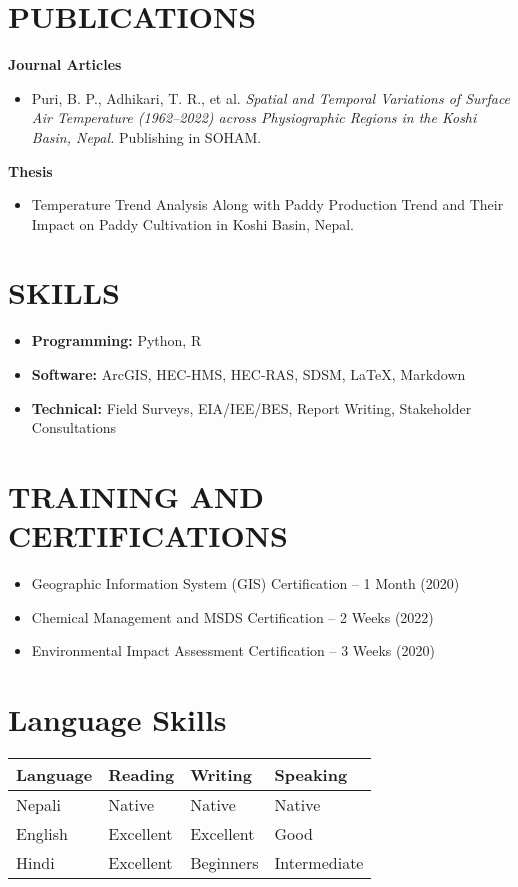 \documentclass[a4paper,9pt]{extarticle}
\begin{document}
\section*{PUBLICATIONS}
\noindent
\textbf{Journal Articles}
\begin{itemize}
    \item Puri, B. P., Adhikari, T. R., et al. \textit{Spatial and Temporal Variations of Surface Air Temperature (1962–2022) across Physiographic Regions in the Koshi Basin, Nepal.} Publishing in SOHAM.
\end{itemize}

\noindent
\textbf{Thesis}
\begin{itemize}
    \item Temperature Trend Analysis Along with Paddy Production Trend and Their Impact on Paddy Cultivation in Koshi Basin, Nepal.

\end{itemize}

\section*{SKILLS}
\begin{itemize}
    \item \textbf{Programming:} Python, R
    \item \textbf{Software:} ArcGIS, HEC-HMS, HEC-RAS, SDSM, LaTeX, Markdown
    \item \textbf{Technical:} Field Surveys, EIA/IEE/BES, Report Writing, Stakeholder Consultations
\end{itemize}

\section*{TRAINING AND CERTIFICATIONS}
\begin{itemize}
    \item Geographic Information System (GIS) Certification – 1 Month (2020)
    \item Chemical Management and MSDS Certification – 2 Weeks (2022)
    \item Environmental Impact Assessment Certification – 3 Weeks (2020)
\end{itemize}

\section*{Language Skills}

\noindent
\begin{tabularx}{\textwidth}{|l|X|X|X|}
\hline
\textbf{Language} & \textbf{Reading} & \textbf{Writing} & \textbf{Speaking} \\ \hline
Nepali & Native & Native & Native \\ \hline
English & Excellent & Excellent & Good \\ \hline
Hindi & Excellent & Beginners & Intermediate \\ \hline
\end{tabularx}
\end{document}
